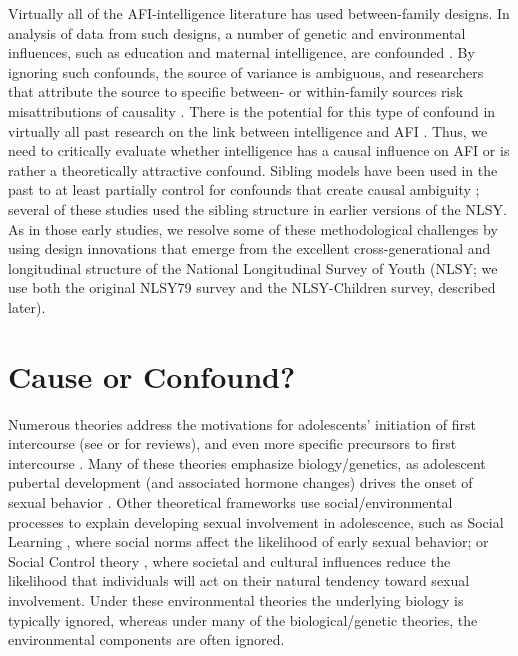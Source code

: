 Virtually all of the AFI-intelligence literature has used between-family designs. In analysis of data from such designs, a number of genetic and environmental influences, such as education and maternal intelligence, are confounded \citep{DOnofrio2013,harden2014genetic,Lahey2010,Rodgers2000}. By ignoring such confounds, the source of variance is ambiguous, and researchers that attribute the source to specific between- or within-family sources risk misattributions of causality \citep{Rowe1997,Rutter2007}. There is the potential for this type of confound in virtually all past research on the link between intelligence and AFI \citep{harden2011don,harden2014genetic,plomin2004intelligence,rodgers1999nature,rodgers1994df}. Thus, we need to critically evaluate whether intelligence has a causal influence on AFI or is rather a theoretically attractive confound. Sibling models have been used in the past to at least partially control for confounds that create causal ambiguity \citep[\eg][]{east1996younger,east1993sisters,geronimus1992socioeconomic,rodgers1990adolescent,rodgers1992sibling};  several of these studies used the sibling structure in earlier versions of the NLSY.  As in those early studies, we resolve some of these methodological challenges by using design innovations that emerge from the excellent cross-generational and longitudinal structure of the National Longitudinal Survey of Youth (NLSY; we use both the original NLSY79 survey and the NLSY-Children survey, described later).
%
\section{Cause or Confound?}
Numerous theories address the motivations for adolescents' initiation of first intercourse (see \citealp{Rodgers1996} or \citealp{Buhi2007} for reviews), and even more specific precursors to first intercourse \citep{Buhi2007,DOnofrio2010,kirby2002antecedents,miller1997timing,santelli1992risk}. Many of these theories emphasize biology/genetics, as adolescent pubertal development (and associated hormone changes) drives the onset of sexual behavior \citep{miller1999dopamine,udry1979age,udry1994nature}. Other theoretical frameworks use social/environmental processes to explain developing sexual involvement in adolescence, such as Social Learning \citep{diblasio1990adolescent,hogben1998using}, where social norms affect the likelihood of early sexual behavior; or Social Control theory \citep{hirschi2002causes}, where societal and cultural influences reduce the likelihood that individuals will act on their natural tendency toward sexual involvement. Under these environmental theories the underlying biology is typically ignored, whereas under many of the biological/genetic theories, the environmental components are often ignored.


